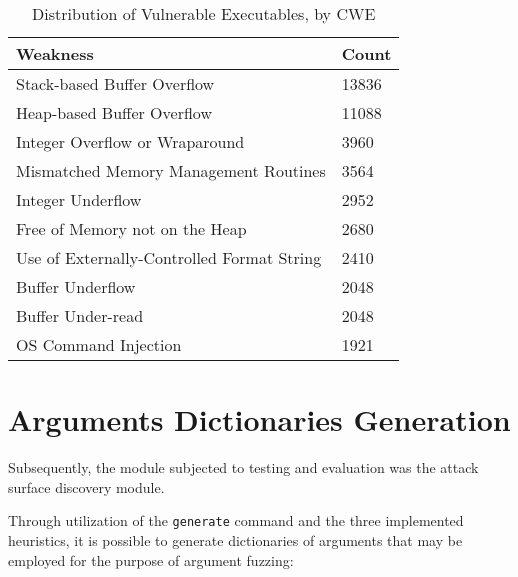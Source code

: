\documentclass[../main.tex]{subfiles}
\begin{document}
\begin{table}[]
  \centering
  \begin{tabular}{|l|l|}
    \hline
    Weakness                                   & Count \\ \hline
    Stack-based Buffer Overflow                & 13836 \\ \hline
    Heap-based Buffer Overflow                 & 11088 \\ \hline
    Integer Overflow or Wraparound             & 3960  \\ \hline
    Mismatched Memory Management Routines      & 3564  \\ \hline
    Integer Underflow                          & 2952  \\ \hline
    Free of Memory not on the Heap             & 2680  \\ \hline
    Use of Externally-Controlled Format String & 2410  \\ \hline
    Buffer Underflow                           & 2048  \\ \hline
    Buffer Under-read                          & 2048  \\ \hline
    OS Command Injection                       & 1921  \\ \hline
  \end{tabular}
  \caption{\label{executables-distribution}Distribution of Vulnerable Executables, by CWE}
\end{table}

\hypertarget{arguments-dictionaries-generation}{%
  \section{Arguments Dictionaries
    Generation}\label{arguments-dictionaries-generation}}

Subsequently, the module subjected to testing and evaluation was the attack
surface discovery module.

Through utilization of the \texttt{generate} command and the three implemented
heuristics, it is possible to generate dictionaries of arguments that may be
employed for the purpose of argument fuzzing:
\end{document}
